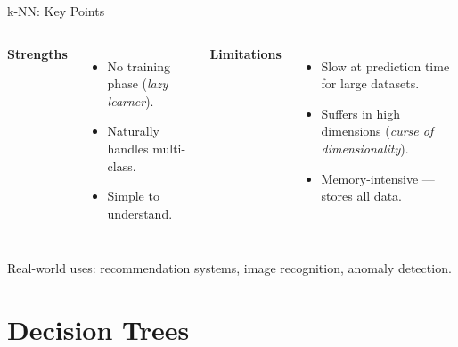 \documentclass[10pt]{beamer}
\begin{document}
\begin{frame}{k-NN: Key Points}
    \begin{columns}[T,onlytextwidth]
        \textbf{Strengths}
        \begin{itemize}
            \item No training phase (\textit{lazy learner}).
            \item Naturally handles multi-class.
            \item Simple to understand.
        \end{itemize}
        \textbf{Limitations}
        \begin{itemize}
            \item Slow at prediction time for large datasets.
            \item Suffers in high dimensions (\textit{curse of dimensionality}).
            \item Memory-intensive — stores all data.
        \end{itemize}
    \end{columns}
    \vspace{0.3cm}
    Real-world uses: recommendation systems, image recognition, anomaly detection.
\end{frame}

\section{Decision Trees}
\end{document}
